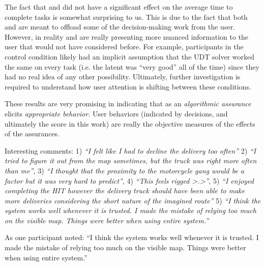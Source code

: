 The fact that \xQ{} and \xO{} did not have a significant effect on the average time to complete tasks is somewhat surprising to us. This is due to the fact that both \xQ{} and \xO{} are meant to offload some of the decision-making work from the user. However, in reality \xQ{} and \xO{} are really presenting more nuanced information to the user that would not have considered before. For example, participants in the control condition likely had an implicit assumption that the UDT solver worked the same on every task (i.e. the latent \xQ{} was ``very good'' all of the time) since they had no real idea of any other possibility. Ultimately, further investigation is required to understand how user attention is shifting between these conditions.

These results are very promising in indicating that \famsec{} as an \emph{algorithmic assurance} elicits \emph{appropriate behavior}. User behaviors (indicated by decisions, and ultimately the score in this work) are really the objective measures of the effects of the assurances.

Interesting comments: 1) \emph{``I felt like I had to decline the delivery too often''} 2) \emph{``I tried to figure it out from the map sometimes, but the truck was right more often than me''}, 3) \emph{``I thought that the proximity to the motorcycle gang would be a factor but it was very hard to predict''}, 4) \emph{``This feels rigged >.>''}, 5) \emph{``I enjoyed completing the HIT however the delivery truck should have been able to make more deliveries considering the short nature of the imagined route''} 5) \emph{``I think the system works well whenever it is trusted. I made the mistake of relying too much on the visible map. Things were better when using entire system.''}

As one participant noted: ``I think the system works well whenever it is trusted. I made the mistake of relying too much on the visible map. Things were better when using entire system.''
